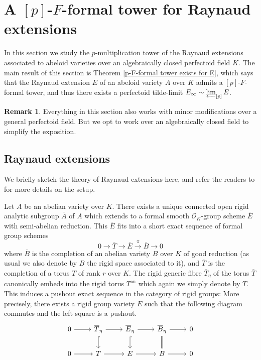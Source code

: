 \documentclass[10pt,oneside]{amsart}
\theoremstyle{definition}
\newtheorem{remark}[theorem]{Remark}
\begin{document}
	

	\section{A $[p]$-$F$-formal tower for Raynaud extensions}\label{Raynaud extensions as principal bundles of formal and rigid spaces}
	In this section we study the $p$-multiplication tower of the Raynaud extensions associated to abeloid varieties over an algebraically closed perfectoid field $K$. The main result of this section is Theorem \ref{p-F-formal tower exists for E}, which says that the Raynaud extension $E$ of an abeloid variety $A$ over $K$ admits a $[p]$-$F$-formal tower, and thus there exists a perfectoid tilde-limit $E_\infty \sim \varprojlim_{[p]} E$.  
	
	
	\begin{remark}\label{Remark on dealing with general perfectoid fields by Galois descent}
		Everything in this section also works with minor modifications over a general perfectoid field. But we opt to work over an algebraically closed field to simplify the exposition.
	\end{remark}
	
	
	\subsection{Raynaud extensions}
	
        We briefly sketch the theory of Raynaud extensions here, and refer the readers to  \cite{Lut} for more details on the setup.

	Let $A$ be an abelian variety over $K$. There exists a unique connected open rigid analytic subgroup $\overline A$ of $A$ which extends to a formal smooth $\mathcal O_K$-group scheme $\overline E$ with semi-abelian reduction. This $\overline E$ fits into a short exact sequence of formal group schemes
	\begin{equation}\label{formal Raynaud extension}
	0\rightarrow \overline T \rightarrow \overline E \xrightarrow{\pi} \overline{B}\rightarrow 0
	\end{equation}
	where $\overline{B}$ is the completion of an abelian variety $B$ over $K$ of good reduction (as usual we also denote by $B$ the rigid space associated to it), and $\overline{T}$ is the completion of a torus $T$ of rank $r$ over $K$.
	The rigid generic fibre $\overline{T}_\eta$ of the torus $\overline{T}$ canonically embeds into the rigid torus $T^{\operatorname{an}}$ which again we simply denote by $T$. This induces a pushout exact sequence in the category of rigid groups: More precisely, there exists a rigid group variety $E$ such that the following diagram commutes and the left square is a pushout.
		\begin{equation}\label{Raynaud diagram}
		\begin{tikzcd}
			0 \arrow[r] & \overline{T}_\eta \arrow[d, hook] \arrow[r] & \overline{E}_\eta \arrow[d, hook] \arrow[r] & \overline{B}_\eta \arrow[d,equal] \arrow[r] & 0 \\
			0 \arrow[r] & T \arrow[r] & E \arrow[r] & B \arrow[r] & 0
		\end{tikzcd}
		\end{equation}
	
\end{document}
